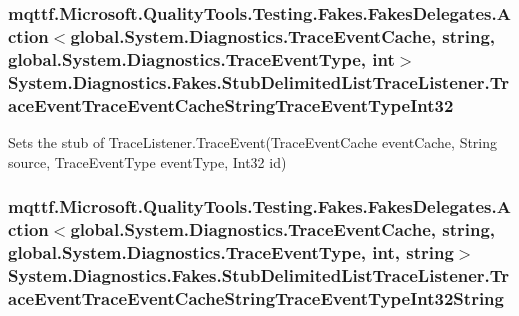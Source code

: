 \hypertarget{class_system_1_1_diagnostics_1_1_fakes_1_1_stub_delimited_list_trace_listener_ac06fe1f6679fff2d7a5672ea34b75af2}{
\subsubsection[{Trace\-Event\-Trace\-Event\-Cache\-String\-Trace\-Event\-Type\-Int32}]{\setlength{\rightskip}{0pt plus 5cm}mqttf.\-Microsoft.\-Quality\-Tools.\-Testing.\-Fakes.\-Fakes\-Delegates.\-Action$<$global.\-System.\-Diagnostics.\-Trace\-Event\-Cache, string, global.\-System.\-Diagnostics.\-Trace\-Event\-Type, int$>$ System.\-Diagnostics.\-Fakes.\-Stub\-Delimited\-List\-Trace\-Listener.\-Trace\-Event\-Trace\-Event\-Cache\-String\-Trace\-Event\-Type\-Int32}}\label{class_system_1_1_diagnostics_1_1_fakes_1_1_stub_delimited_list_trace_listener_ac06fe1f6679fff2d7a5672ea34b75af2}


Sets the stub of Trace\-Listener.\-Trace\-Event(\-Trace\-Event\-Cache event\-Cache, String source, Trace\-Event\-Type event\-Type, Int32 id)

\hypertarget{class_system_1_1_diagnostics_1_1_fakes_1_1_stub_delimited_list_trace_listener_af7d1a9229c2193b06bafd6b49c48cc01}{
\subsubsection[{Trace\-Event\-Trace\-Event\-Cache\-String\-Trace\-Event\-Type\-Int32\-String}]{\setlength{\rightskip}{0pt plus 5cm}mqttf.\-Microsoft.\-Quality\-Tools.\-Testing.\-Fakes.\-Fakes\-Delegates.\-Action$<$global.\-System.\-Diagnostics.\-Trace\-Event\-Cache, string, global.\-System.\-Diagnostics.\-Trace\-Event\-Type, int, string$>$ System.\-Diagnostics.\-Fakes.\-Stub\-Delimited\-List\-Trace\-Listener.\-Trace\-Event\-Trace\-Event\-Cache\-String\-Trace\-Event\-Type\-Int32\-String}}\label{class_system_1_1_diagnostics_1_1_fakes_1_1_stub_delimited_list_trace_listener_af7d1a9229c2193b06bafd6b49c48cc01}


